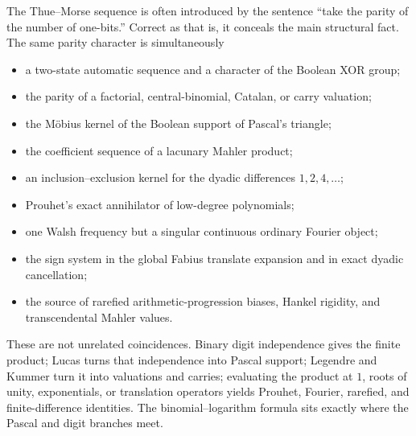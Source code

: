 \documentclass[11pt,oneside]{article}
\theoremstyle{definition}
\theoremstyle{remark}
\begin{document}
The Thue--Morse sequence is often introduced by the sentence ``take the parity of the number
of one-bits.''  Correct as that is, it conceals the main structural fact.  The same parity
character is simultaneously
\begin{itemize}
\item a two-state automatic sequence and a character of the Boolean XOR group;
\item the parity of a factorial, central-binomial, Catalan, or carry valuation;
\item the M\"obius kernel of the Boolean support of Pascal's triangle;
\item the coefficient sequence of a lacunary Mahler product;
\item an inclusion--exclusion kernel for the dyadic differences
      \(1,2,4,\ldots\);
\item Prouhet's exact annihilator of low-degree polynomials;
\item one Walsh frequency but a singular continuous ordinary Fourier object;
\item the sign system in the global Fabius translate expansion and in exact dyadic
      cancellation;
\item the source of rarefied arithmetic-progression biases, Hankel rigidity, and
      transcendental Mahler values.
\end{itemize}
These are not unrelated coincidences.  Binary digit independence gives the finite product;
Lucas turns that independence into Pascal support; Legendre and Kummer turn it into
valuations and carries; evaluating the product at \(1\), roots of unity, exponentials, or
translation operators yields Prouhet, Fourier, rarefied, and finite-difference identities.
The binomial--logarithm formula sits exactly where the Pascal and digit branches meet.
\end{document}

